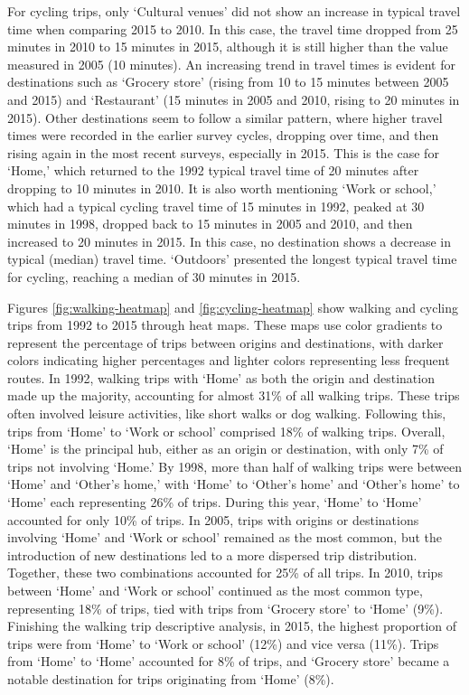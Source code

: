 \documentclass[preprint, 3p,
authoryear]{elsarticle} %
\begin{document}
For cycling trips, only `Cultural venues' did not show an increase in
typical travel time when comparing 2015 to 2010. In this case, the
travel time dropped from 25 minutes in 2010 to 15 minutes in 2015,
although it is still higher than the value measured in 2005 (10
minutes). An increasing trend in travel times is evident for
destinations such as `Grocery store' (rising from 10 to 15 minutes
between 2005 and 2015) and `Restaurant' (15 minutes in 2005 and 2010,
rising to 20 minutes in 2015). Other destinations seem to follow a
similar pattern, where higher travel times were recorded in the earlier
survey cycles, dropping over time, and then rising again in the most
recent surveys, especially in 2015. This is the case for `Home,' which
returned to the 1992 typical travel time of 20 minutes after dropping to
10 minutes in 2010. It is also worth mentioning `Work or school,' which
had a typical cycling travel time of 15 minutes in 1992, peaked at 30
minutes in 1998, dropped back to 15 minutes in 2005 and 2010, and then
increased to 20 minutes in 2015. In this case, no destination shows a
decrease in typical (median) travel time. `Outdoors' presented the
longest typical travel time for cycling, reaching a median of 30 minutes
in 2015.

Figures \ref{fig:walking-heatmap} and \ref{fig:cycling-heatmap} show
walking and cycling trips from 1992 to 2015 through heat maps. These
maps use color gradients to represent the percentage of trips between
origins and destinations, with darker colors indicating higher
percentages and lighter colors representing less frequent routes. In
1992, walking trips with `Home' as both the origin and destination made
up the majority, accounting for almost 31\% of all walking trips. These
trips often involved leisure activities, like short walks or dog
walking. Following this, trips from `Home' to `Work or school' comprised
18\% of walking trips. Overall, `Home' is the principal hub, either as
an origin or destination, with only 7\% of trips not involving `Home.'
By 1998, more than half of walking trips were between `Home' and
`Other's home,' with `Home' to `Other's home' and `Other's home' to
`Home' each representing 26\% of trips. During this year, `Home' to
`Home' accounted for only 10\% of trips. In 2005, trips with origins or
destinations involving `Home' and `Work or school' remained as the most
common, but the introduction of new destinations led to a more dispersed
trip distribution. Together, these two combinations accounted for 25\%
of all trips. In 2010, trips between `Home' and `Work or school'
continued as the most common type, representing 18\% of trips, tied with
trips from `Grocery store' to `Home' (9\%). Finishing the walking trip
descriptive analysis, in 2015, the highest proportion of trips were from
`Home' to `Work or school' (12\%) and vice versa (11\%). Trips from
`Home' to `Home' accounted for 8\% of trips, and `Grocery store' became
a notable destination for trips originating from `Home' (8\%).
\end{document}
